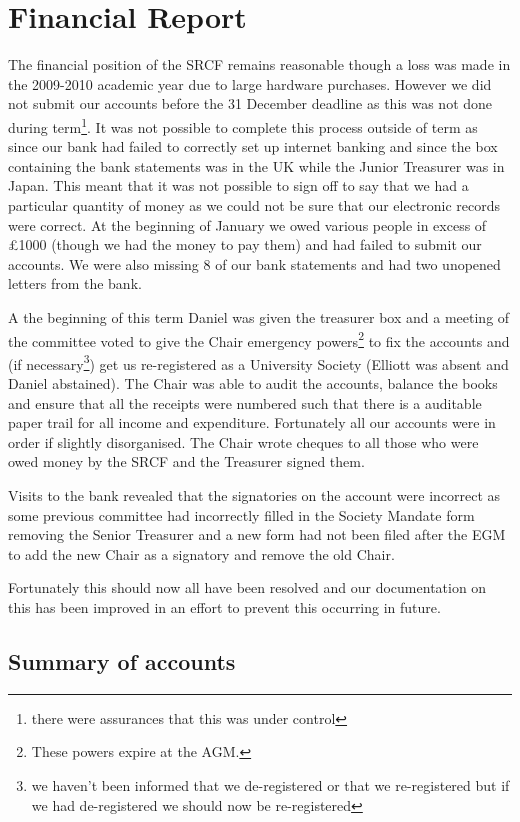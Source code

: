\section{Financial Report}

The financial position of the SRCF remains reasonable though a loss was made in the 2009-2010 academic year due to large hardware purchases.
However we did not submit our accounts before the 31 December deadline as this was not done during term\footnote{there were assurances that this was under control}.
It was not possible to complete this process outside of term as since our bank had failed to correctly set up internet banking and since the box containing the bank statements was in the UK while the Junior Treasurer was in Japan.
This meant that it was not possible to sign off to say that we had a particular quantity of money as we could not be sure that our electronic records were correct.
At the beginning of January we owed various people in excess of £1000 (though we had the money to pay them) and had failed to submit our accounts.
We were also missing 8 of our bank statements and had two unopened letters from the bank.

A the beginning of this term Daniel was given the treasurer box and a meeting of the committee voted to give the Chair emergency powers\footnote{These powers expire at the AGM.} to fix the accounts and (if necessary\footnote{we haven't been informed that we de-registered or that we re-registered but if we had de-registered we should now be re-registered}) get us re-registered as a University Society (Elliott was absent and Daniel abstained). The Chair was able to audit the accounts, balance the books and ensure that all the receipts were numbered such that there is a auditable paper trail for all income and expenditure. Fortunately all our accounts were in order if slightly disorganised. The Chair wrote cheques to all those who were owed money by the SRCF and the Treasurer signed them.

Visits to the bank revealed that the signatories on the account were incorrect as some previous committee had incorrectly filled in the Society Mandate form removing the Senior Treasurer and a new form had not been filed after the EGM to add the new Chair as a signatory and remove the old Chair.

Fortunately this should now all have been resolved and our documentation on this has been improved in an effort to prevent this occurring in future.

\subsection{Summary of accounts}

